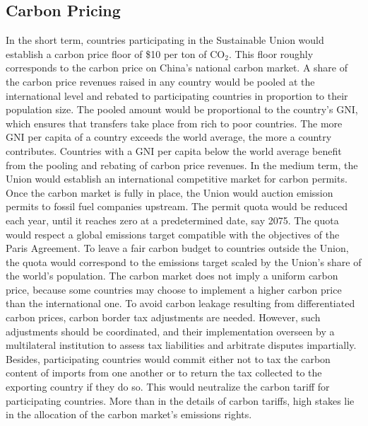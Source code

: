 \documentclass[12pt,english]{article}
\begin{document}
\begin{bibunit}
\section{Carbon Pricing}
In the short term, countries participating in the Sustainable Union would establish a carbon price floor of \$10 per ton of CO$_\text{2}$. This floor roughly corresponds to the carbon price on China's national carbon market. A share of the carbon price revenues raised in any country would be pooled at the international level and rebated to participating countries in proportion to their population size. The pooled amount would be proportional to the country's GNI, which ensures that transfers take place from rich to poor countries. The more GNI per capita of a country exceeds the world average, the more a country contributes. Countries with a GNI per capita below the world average benefit from the pooling and rebating of carbon price revenues. In the medium term, the Union would establish an international competitive market for carbon permits. Once the carbon market is fully in place, the Union would auction emission permits to fossil fuel companies upstream. The permit quota would be reduced each year, until it reaches zero at a predetermined date, say 2075. The quota would respect a global emissions target compatible with the objectives of the Paris Agreement. To leave a fair carbon budget to countries outside the Union, the quota would correspond to the emissions target scaled by the Union's share of the world's population.
The carbon market does not imply a uniform carbon price, because some countries may choose to implement a higher carbon price than the international one. To avoid carbon leakage resulting from differentiated carbon prices, carbon border tax adjustments are needed. However, such adjustments should be coordinated, and their implementation overseen by a multilateral institution to assess tax liabilities and arbitrate disputes impartially. Besides, participating countries would commit either not to tax the carbon content of imports from one another or to return the tax collected to the exporting country if they do so. This would neutralize the carbon tariff for participating countries. More than in the details of carbon tariffs, high stakes lie in the allocation of the carbon market's emissions rights.


\end{bibunit}
\end{document}
